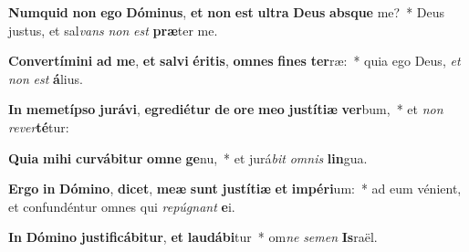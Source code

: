 \item \textbf{Num}\textbf{quid} \textbf{non} \textbf{e}\textbf{go} \textbf{Dó}\textbf{mi}\textbf{nus}, \textbf{et} \textbf{non} \textbf{est} \textbf{ul}\textbf{tra} \textbf{De}\textbf{us} \textbf{abs}\textbf{que} me?~* Deus justus, et sal\textit{vans} \textit{non} \textit{est} \textbf{præ}ter me.
\item \textbf{Con}\textbf{ver}\textbf{tí}\textbf{mi}\textbf{ni} \textbf{ad} \textbf{me}, \textbf{et} \textbf{sal}\textbf{vi} \textbf{é}\textbf{ri}\textbf{tis}, \textbf{om}\textbf{nes} \textbf{fi}\textbf{nes} \textbf{ter}ræ:~* quia ego Deus, \textit{et} \textit{non} \textit{est} \textbf{á}lius.
\item \textbf{In} \textbf{me}\textbf{met}\textbf{íp}\textbf{so} \textbf{ju}\textbf{rá}\textbf{vi}, \textbf{e}\textbf{gre}\textbf{di}\textbf{é}\textbf{tur} \textbf{de} \textbf{o}\textbf{re} \textbf{me}\textbf{o} \textbf{jus}\textbf{tí}\textbf{ti}\textbf{æ} \textbf{ver}bum,~* et \textit{non} \textit{re}\textit{ver}\textbf{té}tur:
\item \textbf{Qui}\textbf{a} \textbf{mi}\textbf{hi} \textbf{cur}\textbf{vá}\textbf{bi}\textbf{tur} \textbf{om}\textbf{ne} \textbf{ge}nu,~* et jurá\textit{bit} \textit{om}\textit{nis} \textbf{lin}gua.
\item \textbf{Er}\textbf{go} \textbf{in} \textbf{Dó}\textbf{mi}\textbf{no}, \textbf{di}\textbf{cet}, \textbf{me}\textbf{æ} \textbf{sunt} \textbf{jus}\textbf{tí}\textbf{ti}\textbf{æ} \textbf{et} \textbf{im}\textbf{pé}\textbf{ri}um:~* ad eum vénient, et confundéntur omnes qui \textit{re}\textit{pú}\textit{gnant} \textbf{e}i.
\item \textbf{In} \textbf{Dó}\textbf{mi}\textbf{no} \textbf{jus}\textbf{ti}\textbf{fi}\textbf{cá}\textbf{bi}\textbf{tur}, \textbf{et} \textbf{lau}\textbf{dá}\textbf{bi}tur~* om\textit{ne} \textit{se}\textit{men} \textbf{Is}raël.
